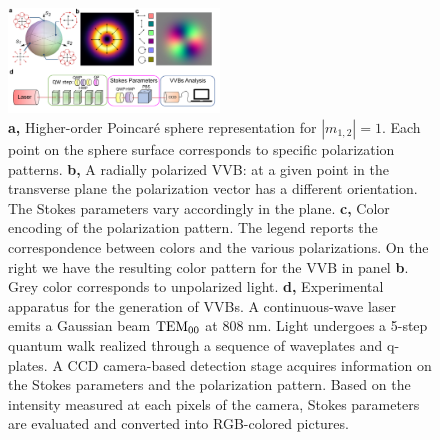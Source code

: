 \documentclass[
	aps, prl, superscriptaddress, twocolumn,
	10pt
	floatfix, 
    nofootinbib,
	tightenlines
]{revtex4-1}
\begin{document}
\begin{figure}[t]
    \includegraphics[width=0.5\textwidth]{Fig1.pdf}
    \caption{{\bf a,} Higher-order Poincar\'e sphere representation for $|m_{1,2}|=1$. Each point on the sphere surface corresponds to specific polarization patterns. 
    {\bf b,} A radially polarized \ac{VVB}: at a given point in the transverse plane the polarization vector has a different orientation. The Stokes parameters vary accordingly in the plane.
    {\bf c,} Color encoding of the polarization pattern. 
    The legend reports the correspondence between colors and the various polarizations.
    On the right we have the resulting color pattern for the VVB in panel {\bf b}.
    Grey color corresponds to unpolarized light.
    {\bf d,} Experimental apparatus for the generation of \ac{VVB}s. A continuous-wave laser emits a Gaussian beam ${\rm TEM}_{00}$ at $808$ nm. Light undergoes a 5-step quantum walk realized through a sequence of waveplates and q-plates.
    A CCD camera-based detection stage acquires information on the Stokes parameters and the polarization pattern. Based on the intensity measured at each pixels of the  camera, Stokes parameters are evaluated and converted into RGB-colored pictures.
    }%
    \label{poinc_sphere}
\end{figure}
\end{document}
